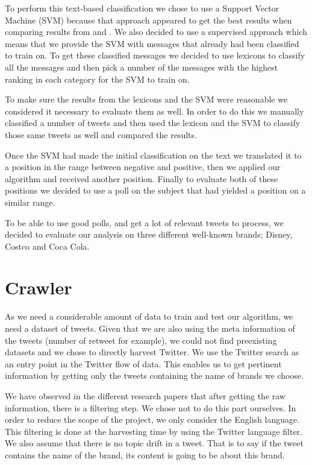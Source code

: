 \documentclass[a4paper,12pt]{report}
\begin{document}
To perform this text-based classification we chose to use a Support Vector Machine (SVM) because that approach appeared to get the best results when comparing results from \cite{Pang02} and \cite{Turney02}.
We also decided to use a supervised approach which means that we provide the SVM with messages that already had been classified to train on.
To get these classified messages we decided to use lexicons to classify all the messages and then pick a number of the messages with the highest ranking in each category for the SVM to train on.

To make sure the results from the lexicons and the SVM were reasonable we considered it necessary to evaluate them as well. 
In order to do this we manually classified a number of tweets and then used the lexicon and the SVM to classify those same tweets as well and compared the results.

Once the SVM had made the initial classification on the text we translated it to a position in the range between negative and positive, then we applied our algorithm and received another position. Finally to evaluate both of these positions we decided to use a poll on the subject that had yielded a position on a similar range.

To be able to use good polls, and get a lot of relevant tweets to process, we decided to evaluate our analysis on three different well-known brands; Disney, Costco and Coca Cola.

\section{Crawler}

As we need a considerable amount of data to train and test our algorithm, we need a dataset of tweets. Given that we are also using the meta information of the tweets (number of retweet for example), we could not find preexisting datasets and we chose to directly harvest Twitter.
We use the Twitter search as an entry point in the Twitter flow of data. This enables us to get pertinent information by getting only the tweets containing the name of brands we choose.

We have observed in the different research papers that after getting the raw information, there is a filtering step. We chose not to do this part ourselves. In order to reduce the scope of the project, we only consider the English language. This filtering is done at the harvesting time by using the Twitter language filter.
We also assume that there is no topic drift in a tweet. That is to say if the tweet contains the name of the brand, its content is going to be about this brand.
\end{document}
